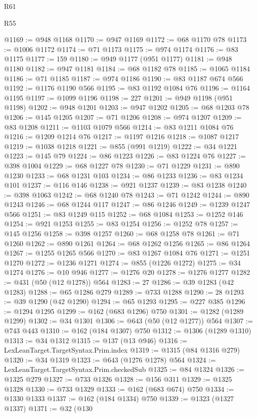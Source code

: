 \begin{lexlean}{R61}
\begin{lexlean}{R55}
\begin{coremodule}
{{{{{{{{{{{{{{{{{{{{{{{{{{{{{{{{{{{{{{{{{{{{{{{{{{{{{{{{{{{{{{@1169 := @948 @1168
@1170 := @947 @1169
@1172 := @68 @1170 @78
@1173 := @1006 @1172
@1174 := @71 @1173
@1175 := @974 @1174
@1176 := @83 @1175
@1177 := 159
@1180 := @949 @1177 (@951 @1177)
@1181 := @948 @1180
@1182 := @947 @1181
@1184 := @68 @1182 @78
@1185 := @1065 @1184
@1186 := @71 @1185
@1187 := @974 @1186
@1190 := @83 @1187 @674 @566
@1192 := @1176 @1190 @566
@1195 := @83 @1192 @1084 @76
@1196 := @1164 @1195
@1197 := @1099 @1196
@1198 := 227
@1201 := @949 @1198 (@951 @1198)
@1202 := @948 @1201
@1203 := @947 @1202
@1205 := @68 @1203 @78
@1206 := @145 @1205
@1207 := @71 @1206
@1208 := @974 @1207
@1209 := @83 @1208
@1211 := @1103 @1079 @566
@1214 := @83 @1211 @1084 @76
@1216 := @1209 @1214 @76
@1217 := @1197 @1216
@1218 := @1087 @1217
@1219 := @1038 @1218
@1221 := @855 (@991 @1219)
@1222 := @34 @1221
@1223 := @145 @79
@1224 := @86 @1223
@1226 := @83 @1224 @76
@1227 := @398 @1004
@1229 := @68 @1227 @78
@1230 := @71 @1229
@1231 := @890 @1230
@1233 := @68 @1231 @103
@1234 := @86 @1233
@1236 := @83 @1234 @101
@1237 := @116 @146
@1238 := @921 @1237
@1239 := @83 @1238
@1240 := @398 @1063
@1242 := @68 @1240 @78
@1243 := @71 @1242
@1244 := @890 @1243
@1246 := @68 @1244 @117
@1247 := @86 @1246
@1249 := @1239 @1247 @566
@1251 := @83 @1249 @115
@1252 := @68 @1084
@1253 := @1252 @146
@1254 := @921 @1253
@1255 := @83 @1254
@1256 := @1252 @78
@1257 := @145 @1256
@1258 := @398 @1257
@1260 := @68 @1258 @78
@1261 := @71 @1260
@1262 := @890 @1261
@1264 := @68 @1262 @1256
@1265 := @86 @1264
@1267 := @1255 @1265 @566
@1270 := @83 @1267 @1084 @76
@1271 := @1251 @1270
@1272 := @1236 @1271
@1274 := @855 (@1226 @1272)
@1275 := @34 @1274
@1276 := @10 @946
@1277 := @1276 @20
@1278 := @1276 @1277
@1282 := @431 (@50 (@12 @1278)) @564
@1283 := 27
@1286 := @39 @1283 (@42 @1283)
@1288 := @65 @1286 @279
@1289 := @733 @1288
@1290 := 28
@1293 := @39 @1290 (@42 @1290)
@1294 := @65 @1293
@1295 := @227 @385
@1296 := @1294 @1295
@1299 := @162 (@683 @1296) @750
@1301 := @1282 (@1289 @1299)
@1302 := @34 @1301
@1306 := @643 (@50 (@12 @1277)) @564
@1307 := @743 @443
@1310 := @162 (@184 @1307) @750
@1312 := @1306 (@1289 @1310)
@1313 := @34 @1312
@1315 := @137 (@13 @946)
@1316 := LexLeanTarget.TargetSyntax.Prim.index
@1319 := @1315 (@84 @1316 @279)
@1320 := @34 @1319
@1323 := @643 (@1276 @1278) @564
@1324 := LexLeanTarget.TargetSyntax.Prim.checkedSub
@1325 := @84 @1324
@1326 := @1325 @279
@1327 := @733 @1326
@1328 := @156 @311
@1329 := @1325 @1328
@1330 := @733 @1329
@1333 := @162 (@683 @674) @750
@1334 := @1330 @1333
@1337 := @162 (@184 @1334) @750
@1339 := @1323 (@1327 @1337)
@1371 := @32
    (@130
}}}}}}}}}}}}}}}}}}}}}}}}}}}}}}}}}}}}}}}}}}}}}}}}}}}}}}}}}}}}}}
\end{coremodule}
\end{lexlean}
\end{lexlean}
